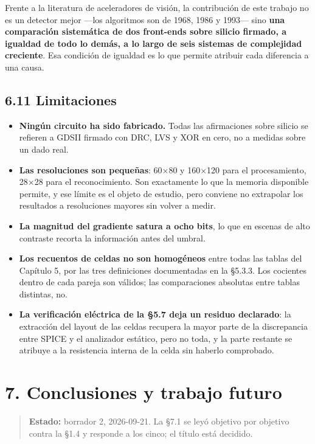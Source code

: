 Frente a la literatura de aceleradores de visión, la contribución de
este trabajo no es un detector mejor ---los algoritmos son de 1968, 1986
y 1993--- sino \textbf{una comparación sistemática de dos front-ends
sobre silicio firmado, a igualdad de todo lo demás, a lo largo de seis
sistemas de complejidad creciente}. Esa condición de igualdad es lo que
permite atribuir cada diferencia a una causa.

\section{6.11 Limitaciones}\label{limitaciones}

\begin{itemize}
\tightlist
\item
  \textbf{Ningún circuito ha sido fabricado.} Todas las afirmaciones
  sobre silicio se refieren a GDSII firmado con DRC, LVS y XOR en cero,
  no a medidas sobre un dado real.
\item
  \textbf{Las resoluciones son pequeñas}: 60×80 y 160×120 para el
  procesamiento, 28×28 para el reconocimiento. Son exactamente lo que la
  memoria disponible permite, y ese límite es el objeto de estudio, pero
  conviene no extrapolar los resultados a resoluciones mayores sin
  volver a medir.
\item
  \textbf{La magnitud del gradiente satura a ocho bits}, lo que en
  escenas de alto contraste recorta la información antes del umbral.
\item
  \textbf{Los recuentos de celdas no son homogéneos} entre todas las
  tablas del Capítulo 5, por las tres definiciones documentadas en la
  §5.3.3. Los cocientes dentro de cada pareja son válidos; las
  comparaciones absolutas entre tablas distintas, no.
\item
  \textbf{La verificación eléctrica de la §5.7 deja un residuo
  declarado}: la extracción del layout de las celdas recupera la mayor
  parte de la discrepancia entre SPICE y el analizador estático, pero no
  toda, y la parte restante se atribuye a la resistencia interna de la
  celda sin haberlo comprobado.
\end{itemize}

\chapter{7. Conclusiones y trabajo
futuro}\label{conclusiones-y-trabajo-futuro}

\begin{quote}
\textbf{Estado:} borrador 2, 2026-09-21. La §7.1 se leyó objetivo por
objetivo contra la §1.4 y responde a los cinco; el título está decidido.
\end{quote}

